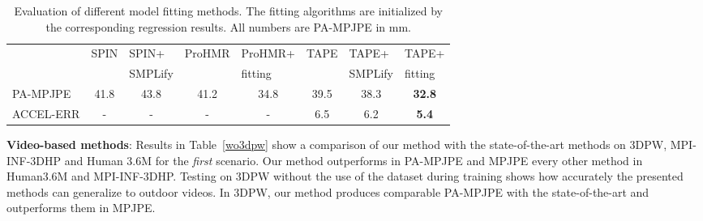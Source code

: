 \documentclass[runningheads]{llncs}
\begin{document}
\begin{table}[t]
\begin{adjustbox}{width={\textwidth}}\begin{tabular}{l|c|c|c|c|c|c|c|}
\cline{2-8}
                                  & \multicolumn{1}{l|}{SPIN} & \multicolumn{1}{l|}{SPIN+} & \multicolumn{1}{l|}{ProHMR} & \multicolumn{1}{l|}{ProHMR+} & \multicolumn{1}{l|}{TAPE} & \multicolumn{1}{l|}{TAPE+} & \multicolumn{1}{l|}{TAPE+} \\ 

                                  & \multicolumn{1}{l|}{ } & \multicolumn{1}{l|}{ SMPLify} & \multicolumn{1}{l|}{ } & \multicolumn{1}{l|}{ fitting} & \multicolumn{1}{l|}{ } & \multicolumn{1}{l|}{SMPLify} & \multicolumn{1}{l|}{fitting} \\ \hline
                                  
\multicolumn{1}{|l|}{PA-MPJPE}    & 41.8                      & 43.8                              & 41.2                        & 34.8                                  & 39.5                      & 38.3                                & \textbf{32.8}                                \\ \hline
\multicolumn{1}{|l|}{ACCEL-ERR} & -                         & -                                 & -                           & -                                     & 6.5                       & 6.2                                 & \textbf{5.4}                                  \\ \hline
\end{tabular}
\end{adjustbox}
\caption{Evaluation of different model fitting methods.
The fitting algorithms are initialized by the corresponding
regression results. All numbers are PA-MPJPE in mm.}
\label{fit}
\end{table}

\vspace*{0.1cm}\noindent\textbf{Video-based methods}: Results in Table~\ref{wo3dpw} show a comparison of our method with the state-of-the-art methods on 3DPW, MPI-INF-3DHP and Human 3.6M for the \textit{first} scenario. Our method outperforms in PA-MPJPE and MPJPE every other method in Human3.6M and MPI-INF-3DHP. Testing on 3DPW without the use of the dataset during training shows how accurately the presented methods can generalize to outdoor videos. In 3DPW, our method produces comparable PA-MPJPE with the state-of-the-art and outperforms them in MPJPE. \\
\end{document}
